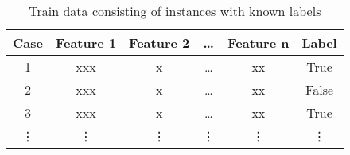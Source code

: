 \begin{table}[h!]
    \centering
    \begin{tabular}{|c|c|c|c|c|c|}
        \hline
        \textbf{Case} & \textbf{Feature 1} & \textbf{Feature 2} & \dots  & \textbf{Feature n} & \textbf{Label} \\
        \hline
        1             & xxx                & x                  & \dots  & xx                 & True           \\
        \hline
        2             & xxx                & x                  & \dots  & xx                 & False          \\
        \hline
        3             & xxx                & x                  & \dots  & xx                 & True           \\
        \hline
        \vdots        & \vdots             & \vdots             & \vdots & \vdots             & \vdots         \\
        \hline
    \end{tabular}
    \caption{Train data consisting of instances with known labels \footnotemark}
    \label{tab:classifier_label_data}
\end{table}
